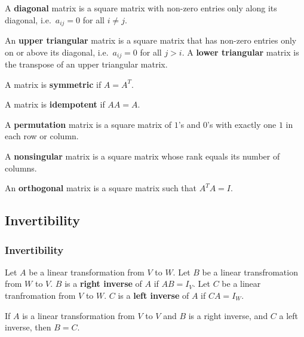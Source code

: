 \documentclass[compress]{beamer}
\begin{document}
\begin{frame}
  \begin{definition}
    A \textbf{diagonal} matrix is a square matrix with non-zero entries
    only along its diagonal, i.e.\ $a_{ij} = 0$ for all $i \neq j$. 
  \end{definition}

  \begin{definition}
    An \textbf{upper triangular} matrix is a square matrix that has
    non-zero entries only on or above its diagonal, i.e.\ $a_{ij} = 0$
    for all $j>i$. A \textbf{lower triangular} matrix is the transpose
    of an upper triangular matrix.
  \end{definition}
  
  \begin{definition}
    A matrix is \textbf{symmetric} if $A = A^T$.
  \end{definition}
\end{frame}

\begin{frame}
  \begin{definition}
    A matrix is \textbf{idempotent} if $AA = A$.
  \end{definition}
  
  \begin{definition}
    A \textbf{permutation} matrix is a square matrix of $1$'s and $0$'s
    with exactly one $1$ in each row or column.  
  \end{definition}
  
  \begin{definition}
    A \textbf{nonsingular} matrix is a square matrix whose rank equals
    its number of columns.
  \end{definition}
  
  \begin{definition}
    An \textbf{orthogonal} matrix is a square matrix such that $A^TA =
    I$.
  \end{definition}
\end{frame}

\subsection{Invertibility}

\begin{frame}
  \frametitle{Invertibility}
  \begin{definition}
    Let $A$ be a linear transformation from $V$ to $W$. Let $B$ be a
    linear transfromation from $W$ to $V$. $B$ is a \textbf{right
      inverse} of $A$ if $AB = I_V$. Let $C$ be a linear tranfromation
    from $V$ to $W$. $C$ is a \textbf{left inverse} of $A$ if $CA = I_W$. 
  \end{definition}  
  
  \begin{lemma}
    If $A$ is a linear transformation from $V$ to $V$ and $B$ is a right
    inverse, and $C$ a left inverse, then $B = C$. 
  \end{lemma}
\end{frame}
\end{document}
